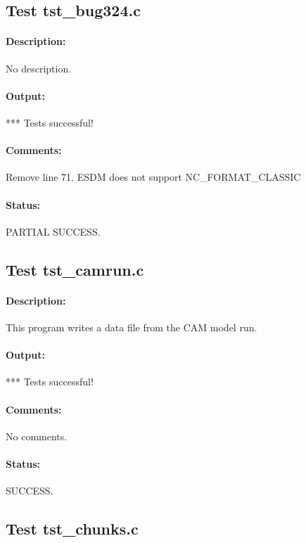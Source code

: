 \subsection{Test tst\_bug324.c}

\paragraph{Description:} No description.

\paragraph{Output:} *** Tests successful!

\paragraph{Comments:} Remove line 71. ESDM does not support NC\_FORMAT\_CLASSIC

\paragraph{Status:} PARTIAL SUCCESS.

\subsection{Test tst\_camrun.c}

\paragraph{Description:} This program writes a data file from the CAM model run.

\paragraph{Output:} *** Tests successful!

\paragraph{Comments:} No comments.

\paragraph{Status:} SUCCESS.

\subsection{Test tst\_chunks.c}

